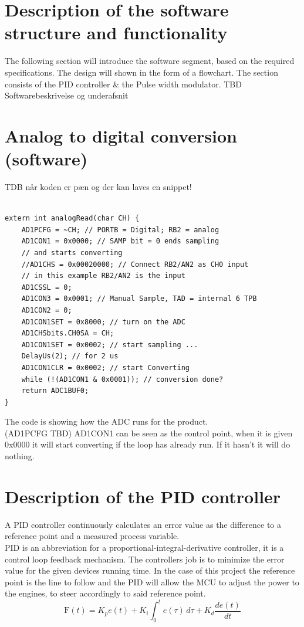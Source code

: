 \section{Description of the software structure and functionality}

The following section will introduce the software segment, based on the required specifications. The design will shown in the form of a flowchart.
The section consists of the PID controller \& the Pulse width modulator.
TBD Softwarebeskrivelse og underafsnit

\section{Analog to digital conversion (software)}

TDB når koden er pæn og der kan laves en snippet!
\begin{lstlisting}

extern int analogRead(char CH) {
    AD1PCFG = ~CH; // PORTB = Digital; RB2 = analog
    AD1CON1 = 0x0000; // SAMP bit = 0 ends sampling
    // and starts converting
    //AD1CHS = 0x00020000; // Connect RB2/AN2 as CH0 input
    // in this example RB2/AN2 is the input
    AD1CSSL = 0;
    AD1CON3 = 0x0001; // Manual Sample, TAD = internal 6 TPB
    AD1CON2 = 0;
    AD1CON1SET = 0x8000; // turn on the ADC
    AD1CHSbits.CH0SA = CH;
    AD1CON1SET = 0x0002; // start sampling ...
    DelayUs(2); // for 2 us
    AD1CON1CLR = 0x0002; // start Converting
    while (!(AD1CON1 & 0x0001)); // conversion done?
    return ADC1BUF0;	
}
\end{lstlisting}

The code is showing how the ADC runs for the product.\\(AD1PCFG TBD)
AD1CON1 can be seen as the control point, when it is given 0x0000 it will start converting if the loop has already run. If it hasn't it will do nothing.

\section {Description of the PID controller} 
A PID controller continuously calculates an error value as the difference to a reference point and a measured process variable.\\
PID is an abbreviation for a proportional-integral-derivative controller, it is a control loop feedback mechanism. The controllers job is to minimize the error value for the given devices running time. In the case of this project the reference point is the line to follow and the PID will allow the MCU to adjust the power to the engines, to steer accordingly to said reference point.
$$\mathrm{F}(t)=K_p{e(t)} + K_{i}\int_{0}^{t}{e(\tau)}\,{d\tau} + K_{d}\frac{de(t)}{dt}$$

